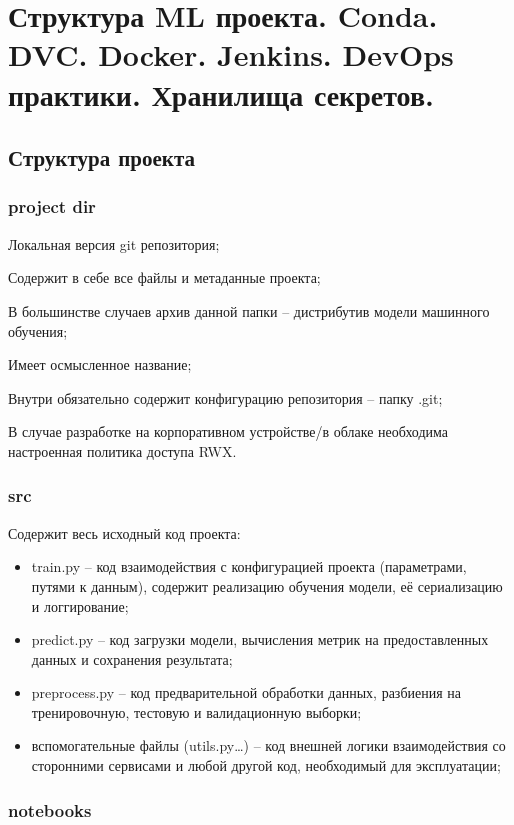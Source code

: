 \section{Структура ML проекта. Conda. DVC. Docker. Jenkins. DevOps практики. Хранилища секретов.}

\subsection*{Структура проекта}

\subsubsection*{project dir}
Локальная версия git репозитория;

Содержит в себе все файлы и метаданные проекта;

В большинстве случаев архив данной папки – дистрибутив
модели машинного обучения;

Имеет осмысленное название;

Внутри обязательно содержит конфигурацию репозитория –
папку .git;

В случае разработке на корпоративном устройстве/в облаке
необходима настроенная политика доступа RWX.

\subsubsection*{src}

Содержит весь исходный код проекта:
\begin{itemize}
    \item train.py – код взаимодействия с конфигурацией проекта
    (параметрами, путями к данным), содержит реализацию
    обучения модели, её сериализацию и логгирование;
    \item predict.py – код загрузки модели, вычисления метрик на
    предоставленных данных и сохранения результата;
    \item preprocess.py – код предварительной обработки данных,
    разбиения на тренировочную, тестовую и валидационную
    выборки;
    \item вспомогательные файлы (utils.py…) – код внешней логики
    взаимодействия со сторонними сервисами и любой другой
    код, необходимый для эксплуатации;
\end{itemize}

\subsubsection*{notebooks}

